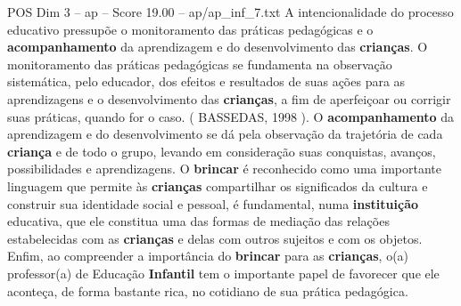 \begin{textsample}{POS Dim 3 – ap – Score 19.00 – ap/ap\_inf\_7.txt}
A intencionalidade do processo educativo pressupõe o monitoramento das práticas pedagógicas e o \textbf{acompanhamento} da aprendizagem e do desenvolvimento das \textbf{crianças}.
O monitoramento das práticas pedagógicas se fundamenta na observação sistemática, pelo educador, dos efeitos e resultados de suas ações para as aprendizagens e o desenvolvimento das \textbf{crianças}, a fim de aperfeiçoar ou corrigir suas práticas, quando for o caso. ( BASSEDAS, 1998 ).
O \textbf{acompanhamento} da aprendizagem e do desenvolvimento se dá pela observação da trajetória de cada \textbf{criança} e de todo o grupo, levando em consideração suas conquistas, avanços, possibilidades e aprendizagens.
O \textbf{brincar} é reconhecido como uma importante linguagem que permite às \textbf{crianças} compartilhar os significados da cultura e construir sua identidade social e pessoal, é fundamental, numa \textbf{instituição} educativa, que ele constitua uma das formas de mediação das relações estabelecidas com as \textbf{crianças} e delas com outros sujeitos e com os objetos.
Enfim, ao compreender a importância do \textbf{brincar} para as \textbf{crianças}, o(a) professor(a) de Educação \textbf{Infantil} tem o importante papel de favorecer que ele aconteça, de forma bastante rica, no cotidiano de sua prática pedagógica.

\end{textsample}
